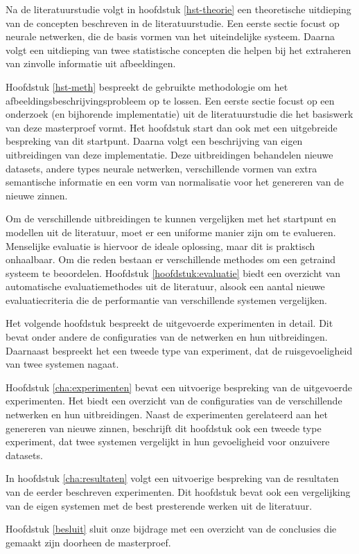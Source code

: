 Na de literatuurstudie volgt in hoofdstuk \ref{hst-theorie} een theoretische uitdieping van de concepten beschreven in de literatuurstudie. Een eerste sectie focust op neurale netwerken, die de basis vormen van het uiteindelijke systeem. Daarna volgt een uitdieping van twee statistische concepten die helpen bij het extraheren van zinvolle informatie uit afbeeldingen.

Hoofdstuk \ref{hst-meth} bespreekt de gebruikte methodologie om het afbeeldingsbeschrijvingsprobleem op te lossen. Een eerste sectie focust op een onderzoek (en bijhorende implementatie) uit de literatuurstudie die het basiswerk van deze masterproef vormt. Het hoofdstuk start dan ook met een uitgebreide bespreking van dit startpunt. Daarna volgt een beschrijving van eigen uitbreidingen van deze implementatie. Deze uitbreidingen behandelen nieuwe datasets, andere types neurale netwerken, verschillende vormen van extra semantische informatie en een vorm van normalisatie voor het genereren van de nieuwe zinnen. 

Om de verschillende uitbreidingen te kunnen vergelijken met het startpunt en modellen uit de literatuur, moet er een uniforme manier zijn om te evalueren. Menselijke evaluatie is hiervoor de ideale oplossing, maar dit is praktisch onhaalbaar. Om die reden bestaan er verschillende methodes om een getraind systeem te beoordelen. Hoofdstuk \ref{hoofdstuk:evaluatie} biedt een overzicht van automatische evaluatiemethodes uit de literatuur, alsook een aantal nieuwe evaluatiecriteria die de performantie van verschillende systemen vergelijken.

Het volgende hoofdstuk bespreekt de uitgevoerde experimenten in detail. Dit bevat onder andere de configuraties van de netwerken en hun uitbreidingen. Daarnaast bespreekt het een tweede type van experiment, dat de ruisgevoeligheid van twee systemen nagaat.

Hoofdstuk \ref{cha:experimenten} bevat een uitvoerige bespreking van de uitgevoerde experimenten. Het biedt een overzicht van de configuraties van de verschillende netwerken en hun uitbreidingen. Naast de experimenten gerelateerd aan het genereren van nieuwe zinnen, beschrijft dit hoofdstuk ook een tweede type experiment, dat twee systemen vergelijkt in hun gevoeligheid voor onzuivere datasets.

In hoofdstuk \ref{cha:resultaten} volgt een uitvoerige bespreking van de resultaten van de eerder beschreven experimenten. Dit hoofdstuk bevat ook een vergelijking van de eigen systemen met de best presterende werken uit de literatuur.

Hoofdstuk \ref{besluit} sluit onze bijdrage met een overzicht van de conclusies die gemaakt zijn doorheen de masterproef.
 
